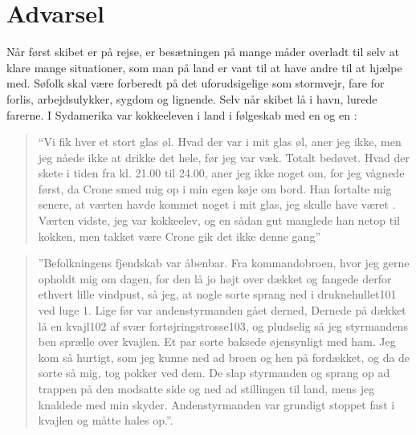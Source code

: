 \chapter{Advarsel}

Når først skibet er på rejse, er besætningen på mange måder overladt til
selv at klare mange situationer, som man på land er vant til at have
andre til at hjælpe med. Søfolk skal være forberedt på det
uforudsigelige som stormvejr, fare for forlis, arbejdsulykker, sygdom og
lignende. Selv når skibet lå i havn, lurede farerne. I Sydamerika var
kokkeeleven i land i følgeskab med en  og en : 

\begin{quote}
    
    ``Vi fik hver et stort glas øl. Hvad der var i mit glas øl, aner jeg
    ikke, men jeg nåede ikke at drikke det hele, før jeg var væk. Totalt
    bedøvet. Hvad der skete i tiden fra kl. 21.00 til 24.00, aner jeg
    ikke noget om, for jeg vågnede først, da Crone smed mig op i min egen
    køje om bord. Han fortalte mig senere, at værten havde kommet noget i
    mit glas, jeg skulle have været . Værten vidste,
    jeg var kokkeelev, og en sådan gut manglede han netop til kokken, men
    takket være Crone gik det ikke denne gang''

\end{quote}

\begin{quote}
    
    ''Befolkningens fjendskab var åbenbar. Fra kommandobroen, hvor jeg
    gerne opholdt mig om dagen, for den lå jo højt over dækket og fangede
    derfor ethvert lille vindpust, så jeg, at nogle sorte sprang ned i
    druknehullet101 ved luge 1. Lige før var andenstyrmanden gået derned,
    Dernede på dækket lå en kvajl102 af svær fortøjringstrosse103, og
    pludselig så jeg styrmandens ben sprælle over kvajlen. Et par sorte
    baksede øjensynligt med ham. Jeg kom så hurtigt, som jeg kunne ned ad
    broen og hen på fordækket, og da de sorte så mig, tog pokker ved dem.
    De slap styrmanden og sprang op ad trappen på den modsatte side og
    ned ad stillingen til land, mens jeg knaldede med min skyder.
    Andenstyrmanden var grundigt stoppet fast i kvajlen og måtte hales
    op.''. 
    
\end{quote}


